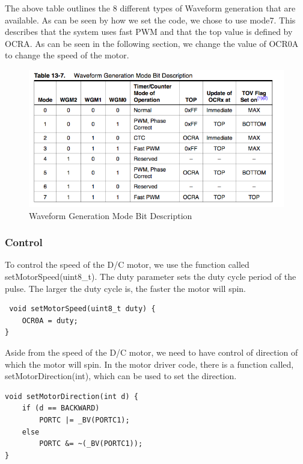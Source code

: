 The above table outlines the 8 different types of  Waveform generation that are available. As can be seen by how we set the code, we chose to use mode7. This describes that the system uses fast PWM and that the top value is defined by OCRA.  As can be seen in the following section, we change the value of OCR0A to  change the speed of the motor.

\begin{figure}[ht]
  \begin{center}
    \includegraphics[width=125mm]{imageSources/waveformGenerationTable.png}
  \end{center}
  \caption{Waveform Generation Mode Bit Description} 
  \label{waveformGenerationTable}
\end{figure}

\subsubsection{Control}
To control the speed of the D/C motor, we use the function called setMotorSpeed(uint8\_t). The duty parameter sets the duty cycle period of the pulse. The larger the duty cycle is, the faster the motor will spin. 

\begin{lstlisting}
 void setMotorSpeed(uint8_t duty) {
	OCR0A = duty;
}
\end{lstlisting}

Aside from the speed of the D/C motor, we need to have control of direction of which the motor will spin. In the motor driver code, there is a function called, setMotorDirection(int), which can be used to set the direction. 

\begin{lstlisting}
void setMotorDirection(int d) {
    if (d == BACKWARD)
        PORTC |= _BV(PORTC1);
    else
        PORTC &= ~(_BV(PORTC1));
}
\end{lstlisting}


